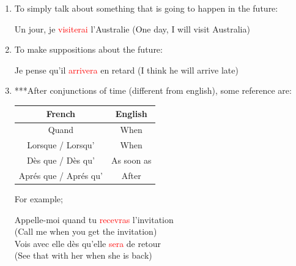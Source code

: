 \documentclass{book}
\begin{document}
\begin{enumerate}
    \item To simply talk about something that is going to happen in the future:
    \begin{center}
        Un jour, je \textcolor{red}{visiterai} l'Australie (One day, I will visit Australia)
    \end{center}

    \item To make suppositions about the future:
    \begin{center}
        Je pense qu'il \textcolor{red}{arrivera} en retard (I think he will arrive late)
    \end{center}

    \item ***After conjunctions of time (different from english), some reference are:
    \begin{center}
        \begin{tabular}{|c|c|}
            \hline
            \textbf{French} & \textbf{English} \\
            \hline
            Quand & When \\
            \hline
            Lorsque / Lorsqu' & When \\
            \hline
            Dès que / Dès qu' & As soon as \\
            \hline
            Aprés que / Aprés qu' & After \\
            \hline
        \end{tabular}
    \end{center}
    For example;
    \begin{center}
        Appelle-moi quand tu \textcolor{red}{recevras} l'invitation \\
        (Call me when you get the invitation) \\
        Vois avec elle dès qu'elle \textcolor{red}{sera} de retour \\
        (See that with her when she is back) 
    \end{center}

\end{enumerate}
\end{document}
